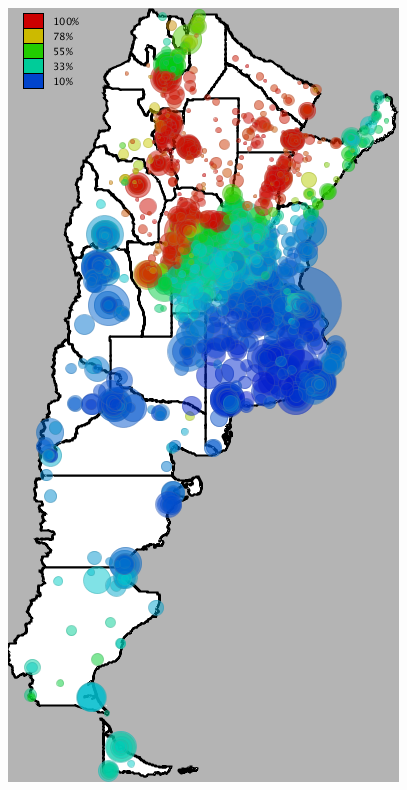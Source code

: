 \begin{figure}[h!]

	\begin{minipage}{.495\linewidth}
		\centering
		\includegraphics[width=0.90\linewidth]
		{figures/201112_hi_res_argentina_usuarios_proporcion_circulos_beta1/201112_hi_res_argentina_usuarios_proporcion_circulos_beta1}


\end{minipage}
\end{figure}
